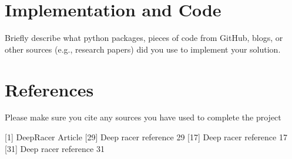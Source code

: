 \documentclass[journal]{IEEEtran}
\begin{document}
\section{Implementation and Code}
Briefly describe what python packages, pieces of code from GitHub, blogs, or other sources (e.g., research papers) did you use to implement your solution.

\section{References}
Please make sure you cite any sources you have used to complete the project

[1] DeepRacer Article
[29] Deep racer reference 29
[17] Deep racer reference 17
[31] Deep racer reference 31
\end{document}
